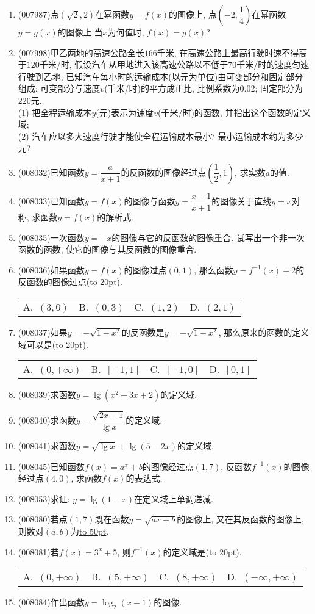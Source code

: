 \documentclass[10pt,a4paper]{article}
\newcommand{\blank}[1]{\underline{\hbox to #1pt{}}}
\newcommand{\bracket}[1]{(\hbox to #1pt{})}
\newcommand{\fourch}[4]{\par\begin{tabular}{p{.23\textwidth}p{.23\textwidth}p{.23\textwidth}p{.23\textwidth}}
A.~#1 &B.~#2& C.~#3& D.~#4
\end{tabular}}
\begin{document}
\begin{enumerate}[1.]
\item {\tiny (007987)}点$(\sqrt 2,2)$在幂函数$y=f(x)$的图像上, 点$(-2,\dfrac 14)$在幂函数$y=g(x)$的图像上.当$x$为何值时, $f(x)=g(x)$?
\item {\tiny (007998)}甲乙两地的高速公路全长$166$千米, 在高速公路上最高行驶时速不得高于$120$千米/时, 假设汽车从甲地进入该高速公路以不低于$70$千米/时的速度匀速行驶到乙地, 已知汽车每小时的运输成本(以元为单位)由可变部分和固定部分组成: 可变部分与速度$v$(千米/时)的平方成正比, 比例系数为$0.02$; 固定部分为$220$元.\\
(1) 把全程运输成本$y$(元)表示为速度$v$(千米/时)的函数, 并指出这个函数的定义域;\\
(2) 汽车应以多大速度行驶才能使全程运输成本最小? 最小运输成本约为多少元?
\item {\tiny (008032)}已知函数$y=\dfrac a{x+1}$的反函数的图像经过点$(\dfrac 12,1)$, 求实数$a$的值.
\item {\tiny (008033)}已知函数$y=f(x)$的图像与函数$y=\dfrac{x-1}{x+1}$的图像关于直线$y=x$对称, 求函数$y=f(x)$的解析式.
\item {\tiny (008035)}一次函数$y=-x$的图像与它的反函数的图像重合. 试写出一个非一次函数的函数, 使它的图像与其反函数的图像重合.
\item {\tiny (008036)}如果函数$y=f(x)$的图像过点$(0, 1)$, 那么函数$y=f^{-1}(x)+2$的反函数的图像过点\bracket{20}.
\fourch{$(3, 0)$}{$(0, 3)$}{$(1, 2)$}{$(2, 1)$}
\item {\tiny (008037)}如果$y=-\sqrt {1-x^2}$的反函数是$y=-\sqrt {1-x^2}$, 那么原来的函数的定义域可以是\bracket{20}.
\fourch{$(0,+\infty)$}{$[-1,1]$}{$[-1,0]$}{$[0,1]$}
\item {\tiny (008039)}求函数$y=\lg (x^2-3x+2)$的定义域.
\item {\tiny (008040)}求函数$y=\dfrac{\sqrt {2x-1}}{\lg x}$的定义域.
\item {\tiny (008041)}求函数$y=\sqrt {\lg x}+\lg (5-2x)$的定义域.
\item {\tiny (008045)}已知函数$f(x)=a^x+b$的图像经过点$(1, 7)$, 反函数$f^{-1}(x)$的图像经过点$(4, 0)$, 求函数$f(x)$的表达式.
\item {\tiny (008053)}求证: $y=\lg(1-x)$在定义域上单调递减.
\item {\tiny (008080)}若点$(1, 7)$既在函数$y=\sqrt {ax+b}$的图像上, 又在其反函数的图像上, 则数对$(a,b)$为\blank{50}.
\item {\tiny (008081)}若$f(x)=3^x+5$, 则$f^{-1}(x)$的定义域是\bracket{20}.
\fourch{$(0,+\infty)$}{$(5,+\infty)$}{$(8,+\infty)$}{$(-\infty ,+\infty)$}
\item {\tiny (008084)}作出函数$y=\log _2(x-1)$的图像.

\end{enumerate}
\end{document}
